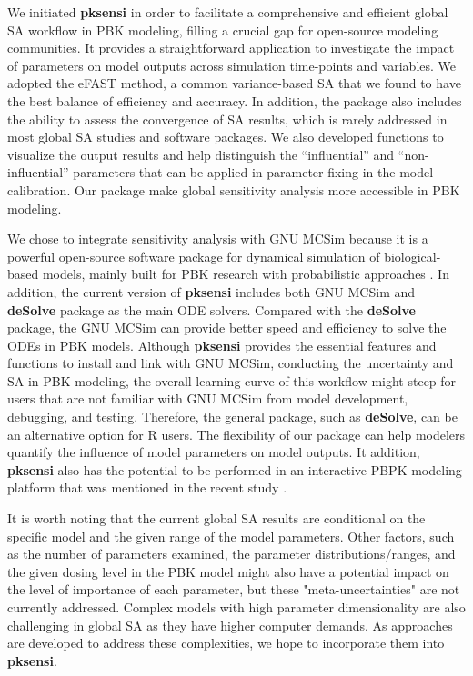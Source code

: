 \documentclass[preprint,12pt, a4paper]{elsarticle}
\begin{document}
We initiated \textbf{pksensi} in order to facilitate a comprehensive and efficient global SA workflow in PBK modeling, filling a crucial gap for open-source modeling communities. It provides a straightforward
application to investigate the impact of parameters on model outputs across simulation time-points and variables. We adopted the eFAST method, a common variance-based SA that we found to have the best
balance of efficiency and accuracy. In addition, the package also includes the ability to assess the convergence of SA results, which is rarely addressed in most global SA studies and software packages. We also developed functions to visualize the output results and help distinguish the ``influential'' and ``non-influential'' parameters that can be applied in parameter fixing in the model calibration. Our package make global sensitivity analysis more accessible in PBK modeling.

We chose to integrate sensitivity analysis with GNU MCSim because it is a powerful open-source software package for dynamical simulation of biological-based models, mainly built for PBK research with probabilistic approaches \cite{bois2009gnu}. In addition, the current version of \textbf{pksensi} includes both GNU MCSim and \textbf{deSolve} package as the main ODE solvers. Compared with the \textbf{deSolve} package, the GNU MCSim can provide better speed and efficiency to solve the ODEs in PBK models. Although \textbf{pksensi} provides the essential features and functions to install and link with GNU MCSim, conducting the uncertainty and SA in PBK modeling, the overall learning curve of this workflow might steep for users that are not familiar with GNU MCSim from model development, debugging, and testing. Therefore, the general package, such as \textbf{deSolve}, can be an alternative option for R users. The flexibility of our package can help modelers quantify the influence of model parameters on model outputs. It addition, \textbf{pksensi} also has the potential to be performed in an interactive PBPK modeling platform that was mentioned in the recent study \cite{li2019integration}.

It is worth noting that the current global SA results are conditional on the specific model and the given range of the model parameters. Other factors, such as the number of parameters examined, the parameter distributions/ranges, and the given dosing level in the PBK model might also have a potential impact on the level of importance of each parameter, but these "meta-uncertainties" are not currently addressed. Complex models with high parameter dimensionality are also challenging in global SA as they have higher computer demands. As approaches are developed to address these complexities, we hope to incorporate them into \textbf{pksensi}.
\end{document}
